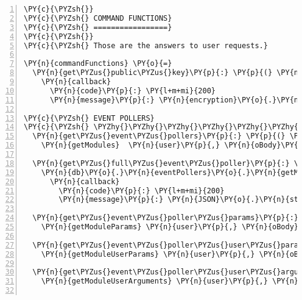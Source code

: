 \begin{Verbatim}[fontsize=\scriptsize,commandchars=\\\{\},numbers=left,firstnumber=1,stepnumber=1]
\PY{c}{\PYZsh{}}
\PY{c}{\PYZsh{} COMMAND FUNCTIONS}
\PY{c}{\PYZsh{} =================}
\PY{c}{\PYZsh{}}
\PY{c}{\PYZsh{} Those are the answers to user requests.}

\PY{n}{commandFunctions} \PY{o}{=}
  \PY{n}{get\PYZus{}public\PYZus{}key}\PY{p}{:} \PY{p}{(} \PY{n}{user}\PY{p}{,} \PY{n}{oBody}\PY{p}{,} \PY{n}{callback} \PY{p}{)} \PY{o}{\PYZhy{}}\PY{o}{\PYZgt{}}
    \PY{n}{callback}
      \PY{n}{code}\PY{p}{:} \PY{l+m+mi}{200}
      \PY{n}{message}\PY{p}{:} \PY{n}{encryption}\PY{o}{.}\PY{n}{getPublicKey}\PY{p}{(}\PY{p}{)}

\PY{c}{\PYZsh{} EVENT POLLERS}
\PY{c}{\PYZsh{} \PYZhy{}\PYZhy{}\PYZhy{}\PYZhy{}\PYZhy{}\PYZhy{}\PYZhy{}\PYZhy{}\PYZhy{}\PYZhy{}\PYZhy{}\PYZhy{}\PYZhy{}}
  \PY{n}{get\PYZus{}event\PYZus{}pollers}\PY{p}{:} \PY{p}{(} \PY{n}{user}\PY{p}{,} \PY{n}{oBody}\PY{p}{,} \PY{n}{callback} \PY{p}{)} \PY{o}{\PYZhy{}}\PY{o}{\PYZgt{}}
    \PY{n}{getModules}  \PY{n}{user}\PY{p}{,} \PY{n}{oBody}\PY{p}{,} \PY{n}{db}\PY{o}{.}\PY{n}{eventPollers}\PY{p}{,} \PY{n}{callback}
  
  \PY{n}{get\PYZus{}full\PYZus{}event\PYZus{}poller}\PY{p}{:} \PY{p}{(} \PY{n}{user}\PY{p}{,} \PY{n}{oBody}\PY{p}{,} \PY{n}{callback} \PY{p}{)} \PY{o}{\PYZhy{}}\PY{o}{\PYZgt{}}
    \PY{n}{db}\PY{o}{.}\PY{n}{eventPollers}\PY{o}{.}\PY{n}{getModule} \PY{n}{user}\PY{o}{.}\PY{n}{username}\PY{p}{,} \PY{n}{oBody}\PY{o}{.}\PY{n}{id}\PY{p}{,} \PY{p}{(} \PY{n}{err}\PY{p}{,} \PY{n}{obj} \PY{p}{)} \PY{o}{\PYZhy{}}\PY{o}{\PYZgt{}}
      \PY{n}{callback}
        \PY{n}{code}\PY{p}{:} \PY{l+m+mi}{200}
        \PY{n}{message}\PY{p}{:} \PY{n}{JSON}\PY{o}{.}\PY{n}{stringify} \PY{n}{obj}
  
  \PY{n}{get\PYZus{}event\PYZus{}poller\PYZus{}params}\PY{p}{:} \PY{p}{(} \PY{n}{user}\PY{p}{,} \PY{n}{oBody}\PY{p}{,} \PY{n}{callback} \PY{p}{)} \PY{o}{\PYZhy{}}\PY{o}{\PYZgt{}}
    \PY{n}{getModuleParams} \PY{n}{user}\PY{p}{,} \PY{n}{oBody}\PY{p}{,} \PY{n}{db}\PY{o}{.}\PY{n}{eventPollers}\PY{p}{,} \PY{n}{callback}

  \PY{n}{get\PYZus{}event\PYZus{}poller\PYZus{}user\PYZus{}params}\PY{p}{:} \PY{p}{(} \PY{n}{user}\PY{p}{,} \PY{n}{oBody}\PY{p}{,} \PY{n}{callback} \PY{p}{)} \PY{o}{\PYZhy{}}\PY{o}{\PYZgt{}}
    \PY{n}{getModuleUserParams} \PY{n}{user}\PY{p}{,} \PY{n}{oBody}\PY{p}{,} \PY{n}{db}\PY{o}{.}\PY{n}{eventPollers}\PY{p}{,} \PY{n}{callback}

  \PY{n}{get\PYZus{}event\PYZus{}poller\PYZus{}user\PYZus{}arguments}\PY{p}{:} \PY{p}{(} \PY{n}{user}\PY{p}{,} \PY{n}{oBody}\PY{p}{,} \PY{n}{callback} \PY{p}{)} \PY{o}{\PYZhy{}}\PY{o}{\PYZgt{}}
    \PY{n}{getModuleUserArguments} \PY{n}{user}\PY{p}{,} \PY{n}{oBody}\PY{p}{,} \PY{n}{db}\PY{o}{.}\PY{n}{eventPollers}\PY{p}{,} \PY{n}{callback}


\end{Verbatim}
